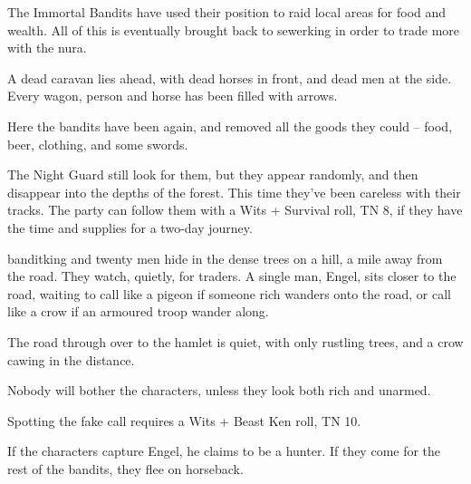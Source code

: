 \begin{multicols}{2}
The Immortal Bandits have used their position to raid local areas for food and wealth.
All of this is eventually brought back to \gls{sewerking} in order to trade more with the nura.


\begin{boxtext}

	A dead caravan lies ahead, with dead horses in front, and dead men at the side.  Every wagon, person and horse has been filled with arrows.

\end{boxtext}

Here the bandits have been again, and removed all the goods they could -- food, beer, clothing, and some swords.

The Night Guard still look for them, but they appear randomly, and then disappear into the depths of the forest.  This time they've been careless with their tracks.  The party can follow them with a Wits + Survival roll, TN 8, if they have the time and supplies for a two-day journey.


\gls{banditking} and twenty men hide in the dense trees on a hill, a mile away from the road.
They watch, quietly, for traders.
A single man, Engel, sits closer to the road, waiting to call like a pigeon if someone rich wanders onto the road, or call like a crow if an armoured troop wander along.

\begin{boxtext}

	The road through over to the hamlet is quiet, with only rustling trees, and a crow cawing in the distance.

\end{boxtext}

Nobody will bother the characters, unless they look both rich and unarmed.

Spotting the fake call requires a Wits + Beast Ken roll, TN 10.

If the characters capture Engel, he claims to be a hunter.
If they come for the rest of the bandits, they flee on horseback.




\end{multicols}
